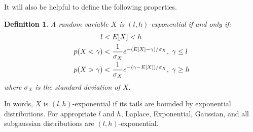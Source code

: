 \documentclass[]{article}
\newtheorem{definition}{Definition}[section]
\begin{document}
It will also be helpful to define the following properties.

\begin{definition}
A random variable $X$ is $(l, h)$-exponential if and only if:
\begin{align}
    l < \hspace{1mm} & E[X] < h \\
    p(X < \gamma) < \hspace{1mm} & \frac{1}{\sigma_X} e^{-(E[X] - \gamma) / \sigma_X}, \hspace{1mm} \gamma \le l \\
    p(X > \gamma) < \hspace{1mm} & \frac{1}{\sigma_X} e^{-(\gamma - E[X]) / \sigma_X}, \hspace{1mm} \gamma \ge h
\end{align}
where $\sigma_X$ is the standard deviation of $X$.
\end{definition}
In words, $X$ is $(l, h)$-exponential if its tails are bounded by exponential distributions. For appropriate $l$ and $h$, Laplace, Exponential, Gaussian, and all subgaussian distributions are $(l, h)$-exponential.


\end{document}
